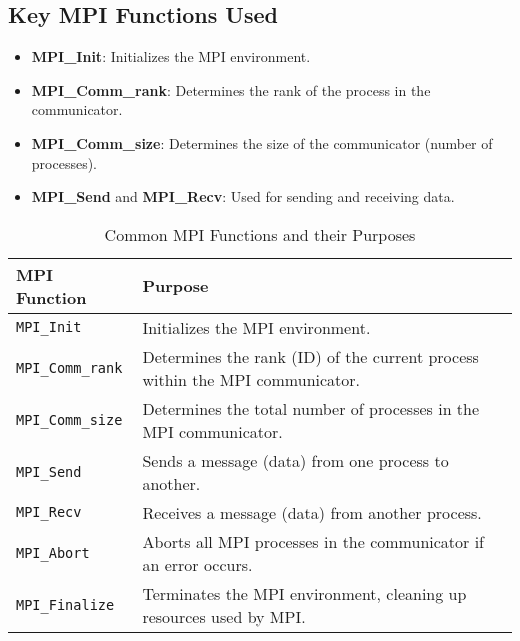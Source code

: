 \documentclass[a4paper,12pt]{article}
\begin{document}
\subsection{Key MPI Functions Used}
\begin{itemize}
    \item \textbf{MPI\_Init}: Initializes the MPI environment.
    \item \textbf{MPI\_Comm\_rank}: Determines the rank of the process in the communicator.
    \item \textbf{MPI\_Comm\_size}: Determines the size of the communicator (number of processes).
    \item \textbf{MPI\_Send} and \textbf{MPI\_Recv}: Used for sending and receiving data.
\end{itemize}
\begin{table}[h!]
\centering
\begin{tabular}{|p{4cm}|p{10cm}|}
\hline
\textbf{MPI Function}  & \textbf{Purpose}                                                                                   \\ \hline
\texttt{MPI\_Init}     & Initializes the MPI environment.                                                                   \\ \hline
\texttt{MPI\_Comm\_rank} & Determines the rank (ID) of the current process within the MPI communicator.                      \\ \hline
\texttt{MPI\_Comm\_size} & Determines the total number of processes in the MPI communicator.                                 \\ \hline
\texttt{MPI\_Send}     & Sends a message (data) from one process to another.                                                \\ \hline
\texttt{MPI\_Recv}     & Receives a message (data) from another process.                                                    \\ \hline
\texttt{MPI\_Abort}    & Aborts all MPI processes in the communicator if an error occurs.                                   \\ \hline
\texttt{MPI\_Finalize} & Terminates the MPI environment, cleaning up resources used by MPI.                                 \\ \hline
\end{tabular}
\caption{Common MPI Functions and their Purposes}
\label{table:mpi_functions}
\end{table}
\end{document}
